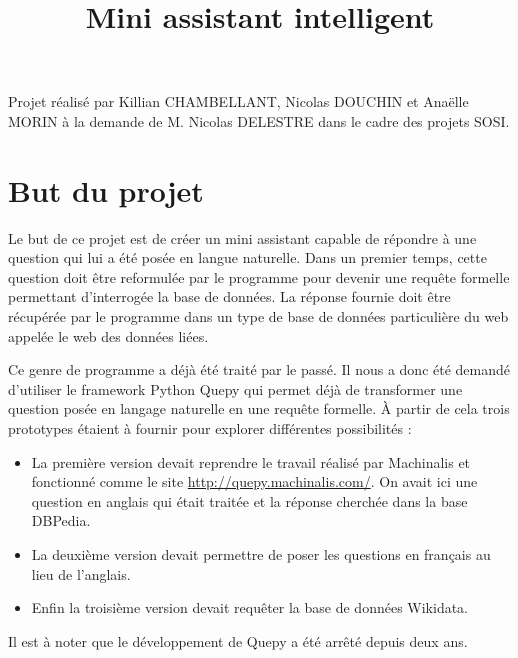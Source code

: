 \documentclass[11pt,a4paper]{article}
\title{Mini assistant intelligent}
\author{}
\begin{document}

Projet réalisé par Killian CHAMBELLANT, Nicolas DOUCHIN et Anaëlle MORIN à la demande de M. Nicolas DELESTRE dans le cadre des projets SOSI.


\section*{But du projet}\par
Le but de ce projet est de créer un mini assistant capable de répondre à une question qui lui a été posée en langue naturelle. 
Dans un premier temps, cette question doit être reformulée par le programme pour devenir une requête formelle permettant d'interrogée la base de données. La réponse fournie doit être récupérée par le programme dans un type de base de données particulière du web appelée le web des données liées.\par 
Ce genre de programme a déjà été traité par le passé. Il nous a donc été demandé d'utiliser le framework Python Quepy qui permet déjà de transformer une question posée en langage naturelle en une requête formelle. À partir de cela trois prototypes étaient à fournir pour explorer différentes possibilités : \par
\begin{itemize}
\item La première version devait reprendre le travail réalisé par Machinalis et fonctionné comme le site \url{http://quepy.machinalis.com/}. On avait ici une question en anglais qui était traitée et la réponse cherchée dans la base DBPedia.
\item La deuxième version devait permettre de poser les questions en français au lieu de l'anglais.
\item Enfin la troisième version devait requêter la base de données Wikidata.
\end{itemize}\par
Il est à noter que le développement de Quepy a été arrêté depuis deux ans.
\end{document}

